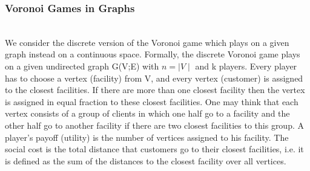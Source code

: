 \documentclass[12pt]{article}
\begin{document}
\subsubsection{Voronoi Games in Graphs}\\

\intend We consider the discrete version of the Voronoi game which plays on a given graph instead on a continuous space. Formally, the discrete Voronoi game plays on a given undirected graph G(V;E) with $n =\mid V\mid$ and k players. Every player has to choose a vertex (facility) from V, and every vertex (customer) is assigned to the closest facilities. If there are more than one closest facility then the vertex is assigned in equal fraction to these closest facilities. One may think that each vertex consists of a group of clients in which one half go to a facility and the other half go to another facility if there are two closest facilities to this group. A player's payoff (utility) is the number of vertices assigned to his facility. The social cost is the total distance that customers go to their closest facilities, i.e. it is defined as the sum of the distances to the closest facility over all vertices.\cite{Teramoto06voronoigame}\\
\end{document}
